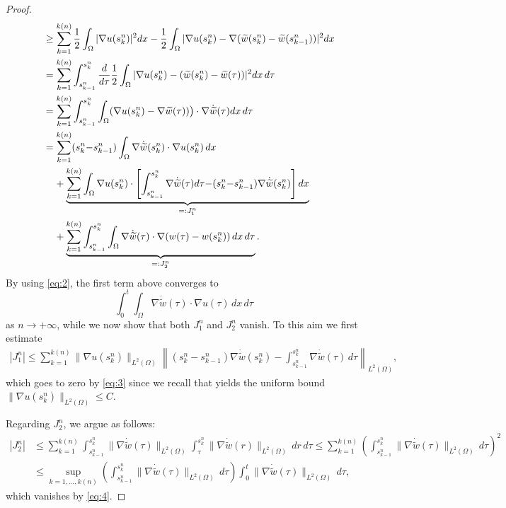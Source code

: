 \documentclass[a4paper,11pt,reqno]{amsart}
\numberwithin{equation}{section}
\theoremstyle{definition}
\theoremstyle{remark}
\begin{document}
\begin{proof}
{\begin{align}
        &\quad \ge \sum_{k=1}^{k(n)}\frac 12 \int_\Omega |\nabla u(s^n_k)|^2 dx-\frac 12 \int_\Omega |\nabla u(s^n_k)-\nabla (\widetilde w(s^n_{k})-\widetilde w(s^n_{k-1}))|^2 dx\\
        &\quad=\sum_{k=1}^{k(n)}\int_{s^n_{k-1}}^{s^n_k}\frac{d}{d\tau}\frac 12 \int_\Omega |\nabla u(s^n_k)-(\widetilde w(s^n_{k})-\widetilde w(\tau))|^2 dx    \, d\tau   
        \\
        &\quad=\sum_{k=1}^{k(n)}\int_{s^n_{k-1}}^{s^n_k}\int_\Omega (\nabla u(s^n_k)-\nabla \widetilde w(\tau))\big)\cdot\nabla \dot{\widetilde w}(\tau) dx\, d\tau\\
        &\quad= \sum_{k=1}^{k(n)} (s^n_k{-}s^n_{k-1})\int_\Omega \nabla \dot{\widetilde w}(s^n_k)\cdot \nabla u(s^n_k)\, dx\\
        & \quad \hphantom{=} \,\,+ \underbrace{\sum_{k=1}^{k(n)}\int_\Omega \nabla u(s^n_k)\cdot\left[\int_{s^n_{k-1}}^{s^n_k} \nabla \dot{\widetilde w}(\tau)d\tau{-}(s^n_k{-}s^n_{k-1})\nabla \dot{\widetilde w}(s^n_k)\right]dx}_{=:J_1^n}\\
        &\quad \hphantom{=} \, \,+ \underbrace{\sum_{k=1}^{k(n)}\int_{s^n_{k-1}}^{s^n_k}\int_\Omega \nabla \dot{\widetilde w}(\tau)\cdot \nabla(w(\tau)-w(s^n_k))\, dx\,d\tau}_{=:J_2^n}.
    \end{align}}
    By using \eqref{eq:2}, the first term above converges to
    \begin{equation}
        \int_0^t\int_\Omega \nabla \dot{\widetilde w}(\tau)\cdot \nabla u(\tau)\,dx\,d\tau
    \end{equation}
    as $n\to +\infty$, while we now show that both $J_1^n$ and $J_2^n$ vanish. To this aim we first estimate
    \begin{align}
        |J_1^n|\le \sum_{k=1}^{k(n)}\|\nabla u(s^n_k)\|_{L^2(\Omega)}\left\|(s^n_k-s^n_{k-1})\nabla \dot{\widetilde w}(s^n_k)-\int_{s^n_{k-1}}^{s^n_k} \nabla  \dot{\widetilde w}(\tau)\,d\tau\right\|_{L^2(\Omega)},
    \end{align}
    which goes to zero by \eqref{eq:3} since we recall that  yields the uniform bound $\|\nabla u(s^n_k)\|_{L^2(\Omega)}\le C$.

    Regarding $J_2^n$, we argue as follows:
    \begin{align}
        |J_2^n|&\le \sum_{k=1}^{k(n)}\int_{s^n_{k-1}}^{s^n_k}\|\nabla \dot{\widetilde w}(\tau)\|_{L^2(\Omega)}\int_{\tau}^{s^n_k}\|\nabla \dot{\widetilde w}(r)\|_{L^2(\Omega)}\,dr\,d\tau\le \sum_{k=1}^{k(n)}\left(\int_{s^n_{k-1}}^{s^n_k}\|\nabla \dot{\widetilde w}(\tau)\|_{L^2(\Omega)}\,d\tau\right)^2\\
        &\le \sup_{k=1,\dots,k(n)}\left(\int_{s^n_{k-1}}^{s^n_k}\|\nabla \dot{\widetilde w}(\tau)\|_{L^2(\Omega)} \, d\tau\right)\int_0^t\|\nabla \dot{\widetilde w}(\tau)\|_{L^2(\Omega)}\, d\tau,
    \end{align}
    which vanishes by \eqref{eq:4}.


\end{proof}
\end{document}
